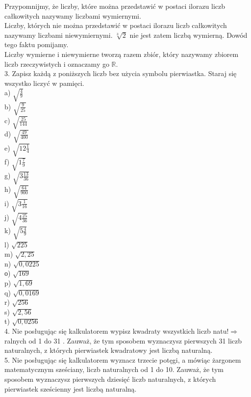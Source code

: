 \documentclass[10pt]{article}
\begin{document}
Przypomnijmy, że liczby, które można przedstawić w postaci ilorazu liczb całkowitych nazywamy liczbami wymiernymi.\\
Liczby, których nie można przedstawić w postaci ilorazu liczb całkowitych nazywamy liczbami niewymiernymi. \(\sqrt[3]{2}\) nie jest zatem liczbą wymierną. Dowód tego faktu pomijamy.\\
Liczby wymierne i niewymierne tworzą razem zbiór, który nazywamy zbiorem liczb rzeczywistych i oznaczamy go \(\mathbb{R}\).\\
3. Zapisz każdą z poniższych liczb bez użycia symbolu pierwiastka. Staraj się wszystko liczyć w pamięci.\\
a) \(\sqrt{\frac{4}{9}}\)\\
b) \(\sqrt{\frac{9}{25}}\)\\
c) \(\sqrt{\frac{25}{144}}\)\\
d) \(\sqrt{\frac{49}{400}}\)\\
e) \(\sqrt{12 \frac{1}{4}}\)\\
f) \(\sqrt{1 \frac{7}{9}}\)\\
g) \(\sqrt{3 \frac{13}{36}}\)\\
h) \(\sqrt{\frac{64}{900}}\)\\
i) \(\sqrt{3 \frac{1}{16}}\)\\
j) \(\sqrt{4 \frac{25}{36}}\)\\
k) \(\sqrt{5 \frac{4}{9}}\)\\
l) \(\sqrt{225}\)\\
m) \(\sqrt{2,25}\)\\
n) \(\sqrt{0,0225}\)\\
о) \(\sqrt{169}\)\\
p) \(\sqrt{1,69}\)\\
q) \(\sqrt{0,0169}\)\\
r) \(\sqrt{256}\)\\
s) \(\sqrt{2,56}\)\\
t) \(\sqrt{0,0256}\)\\
4. Nie posługując się kalkulatorem wypisz kwadraty wszystkich liczb natu\(!\Rightarrow \quad\) ralnych od 1 do 31 . Zauważ, że tym sposobem wyznaczysz pierwszych 31 liczb naturalnych, z których pierwiastek kwadratowy jest liczbą naturalną.\\
5. Nie posługując się kalkulatorem wyznacz trzecie potęgi, a mówiąc żargonem matematycznym sześciany, liczb naturalnych od 1 do 10. Zauważ, że tym sposobem wyznaczysz pierwszych dziesięć liczb naturalnych, z których pierwiastek sześcienny jest liczbą naturalną.\\
\end{document}
